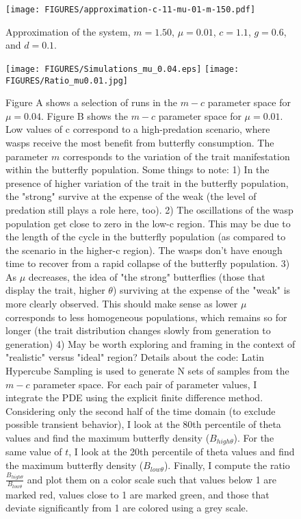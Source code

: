 \documentclass[review,authoryear]{elsarticle}
\begin{document}
\begin{figure}[htb]
  \centering
  \texttt{[image: FIGURES/approximation-c-11-mu-01-m-150.pdf]}
  \caption[Approximation with $c=1.1$, $m=1.50$ and $\mu=0.01$.]{Approximation of
    the system, $m=1.50$, $\mu=0.01$, $c=1.1$, $g=0.6$, and $d=0.1$. }
  \label{fig:approximationM150Mu01C11}
\end{figure}



\begin{figure}[!htp]
\begin{center}
\texttt{[image: FIGURES/Simulations\_mu\_0.04.eps]} 
\texttt{[image: FIGURES/Ratio\_mu0.01.jpg]}  
\end{center}

\caption{Figure A shows a selection of runs in the $m-c$ parameter space for $\mu=0.04$. Figure B shows the $m-c$ parameter space for $\mu=0.01$. Low values of c correspond to a high-predation scenario, where wasps receive the most benefit from butterfly consumption. The parameter $m$ corresponds to the variation of the trait manifestation within the butterfly population. Some things to note: 1) In the presence of higher variation of the trait in the butterfly population, the "strong" survive at the expense of the weak (the level of predation still plays a role here, too).
2) The oscillations of the wasp population get close to zero in the low-c region. This may be due to the length of the cycle in the butterfly population (as compared to the scenario in the higher-c region). The wasps don't have enough time to recover from a rapid collapse of the butterfly population. 3) As $\mu$ decreases, the idea of "the strong" butterflies (those that display the trait, higher $\theta$)  surviving at the expense of the "weak" is more clearly observed. This should make sense as lower $\mu$ corresponds to less homogeneous populations, which remains so for longer (the trait distribution changes slowly from generation to generation) 4) May be worth exploring and framing in the context of "realistic" versus "ideal" region?
Details about the code:  Latin Hypercube Sampling is used to generate N sets of samples from the $m-c$ parameter space. For each pair of parameter values, I integrate the PDE using the explicit finite difference method. Considering only the second half of the time domain (to exclude possible transient behavior), I look at the 80th percentile of theta values and find the maximum butterfly density ($B_{high\theta}$). For the same value of $t$, I look at the 20th percentile of theta values and find the maximum butterfly density ($B_{low\theta}$). Finally, I compute the ratio $\frac{B_{high\theta}}{B_{low\theta}}$ and plot them on a color scale such that values below 1 are marked red, values close to 1 are marked green, and those that deviate significantly from 1 are colored using a grey scale.}
      \label{fig:mvsc}
\end{figure}
\end{document}
